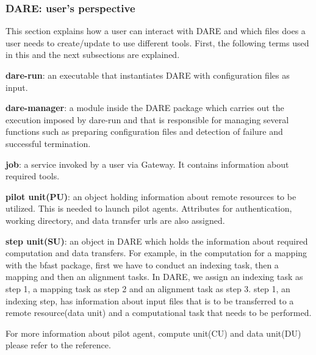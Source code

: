 \documentclass[]{svjour3}
\begin{document}
\subsubsection{DARE: user's perspective}


   
This section explains how a user can interact with DARE and which files does a user needs to create/update to use different tools. First, the following terms used in this and the next subsections are explained.

\textbf{dare-run}: an executable that instantiates DARE with configuration files as input.
 
\textbf{dare-manager}: a module inside the DARE package which carries
out the execution imposed by dare-run and that is responsible for
managing several functions such as preparing configuration files and
detection of failure and successful termination.

\textbf{job}: a service invoked by a user via Gateway. It contains information about required tools. 

\textbf{pilot unit(PU)}: an object holding information about remote
resources to be utilized. This is needed to launch pilot agents.
Attributes for authentication, working directory, and data transfer
urls are also assigned.

\textbf{step unit(SU)}: an object in DARE which holds the information
about required computation and data transfers. For example, in the
computation for a mapping with the bfast package, first we have to
conduct an indexing task, then a mapping and then an alignment tasks.
In DARE, we assign an indexing task as step 1, a mapping task as step
2 and an alignment task as step 3. step 1, an indexing step, has
information about input files that is to be transferred to a remote
resource(data unit) and a computational task that needs to be
performed.

For more information about pilot agent, compute unit(CU) and data unit(DU) please refer to the reference\cite{pstar11}.

   
\end{document}
